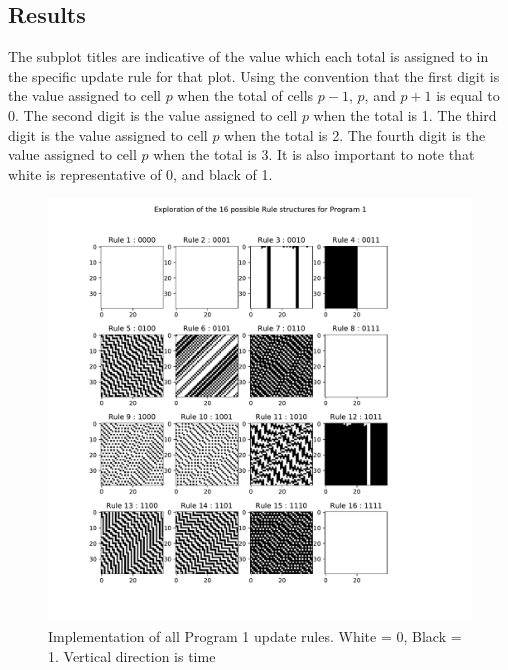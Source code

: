 \documentclass{article}
\begin{document}
\subsection{Results}
The subplot titles are indicative of the value which each total is assigned to in the specific update rule for that plot. Using the convention that the first digit is the value assigned to cell $p$ when the total of cells $p-1$, $p$, and $p+1$ is equal to 0. The second digit is the value assigned to cell $p$ when the total is 1. The third digit is the value assigned to cell $p$ when the total is 2. The fourth digit is the value assigned to cell $p$ when the total is 3. It is also important to note that white is representative of 0, and black of 1.
\begin{figure}[H]
\centering
\includegraphics[scale=0.5]{Program 1 Exploration.pdf}
\caption{Implementation of all Program 1 update rules. White = 0, Black = 1. Vertical direction is time}
\end{figure}
\end{document}
